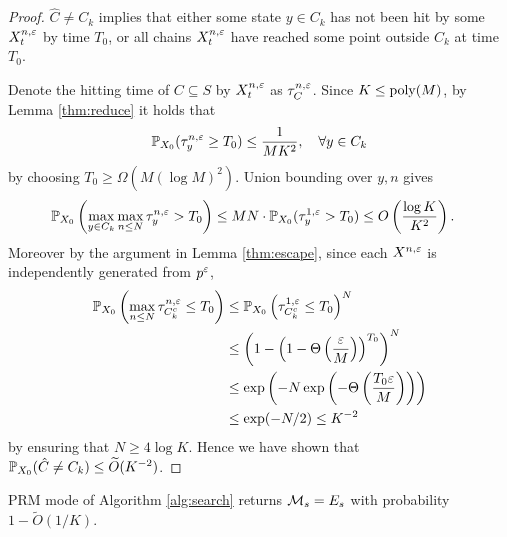 \begin{proof}
$\hat{C}\ne C_k$ implies that either some state $y\in C_k$ has not been hit by some $X_t^{n,\varepsilon}$ by time $T_0$, or all chains $X_t^{n,\varepsilon}$ have reached some point outside $C_k$ at time $T_0$.

Denote the hitting time of $C\subseteq S$ by $X_t^{n,\varepsilon}$ as $\tau_C^{n,\varepsilon}$. Since $K\le\operatorname{poly}(M)$, by Lemma \ref{thm:reduce} it holds that
\begin{equation*}
\mathbb{P}_{X_0}(\tau_y^{n,\varepsilon}\ge T_0) \le\frac{1}{MK^2}, \quad \forall y\in C_k
\end{equation*}
by choosing $T_0\ge \Omega(M(\log M)^2)$. Union bounding over $y,n$ gives
\begin{align*}
\mathbb{P}_{X_0}\left(\max_{y\in C_k}\max_{n\le N}\tau_y^{n,\varepsilon}> T_0\right) &\le MN\cdot \mathbb{P}_{X_0}(\tau_y^{1,\varepsilon}> T_0) \le O\left(\frac{\log K}{K^2}\right).
\end{align*}
Moreover by the argument in Lemma \ref{thm:escape}, since each $X^{n,\varepsilon}$ is independently generated from $p^\varepsilon$,
\begin{align*}
\mathbb{P}_{X_0}\left(\max_{n\le N}\tau_{C_k^c}^{n,\varepsilon}\le T_0\right) &\le \mathbb{P}_{X_0}\left(\tau_{C_k^c}^{1,\varepsilon}\le T_0\right)^N\\
&\le \left(1 - \left(1-\Theta\left(\frac{\varepsilon}{M}\right)\right)^{T_0}\right)^N\\
&\le \exp\left(-N\exp\left(-\Theta\left(\frac{T_0\varepsilon}{M}\right)\right)\right) \\
&\le \exp (-N/2) \le K^{-2}
\end{align*}
by ensuring that $N\ge 4\log K$. Hence we have shown that $\mathbb{P}_{X_0}(\hat{C}\ne C_k) \le \widetilde{O}(K^{-2})$.
\end{proof}

\begin{prop}
PRM mode of Algorithm \ref{alg:search} returns $\mathcal{M}_s = E_s$ with probability $1-\widetilde{O}(1/K)$.
\end{prop}


